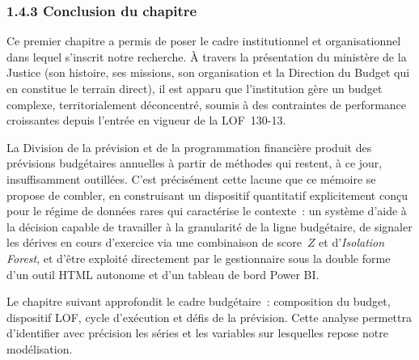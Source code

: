 \subsubsection*{1.4.3 \quad Conclusion du chapitre}

Ce premier chapitre a permis de poser le cadre institutionnel et organisationnel dans lequel s'inscrit notre recherche. \`A travers la pr\'esentation du minist\`ere de la Justice (son histoire, ses missions, son organisation et la Direction du Budget qui en constitue le terrain direct), il est apparu que l'institution g\`ere un budget complexe, territorialement d\'econcentr\'e, soumis \`a des contraintes de performance croissantes depuis l'entr\'ee en vigueur de la LOF~130-13.

La Division de la pr\'evision et de la programmation financi\`ere produit des pr\'evisions budg\'etaires annuelles \`a partir de m\'ethodes qui restent, \`a ce jour, insuffisamment outill\'ees. C'est pr\'ecis\'ement cette lacune que ce m\'emoire se propose de combler, en construisant un dispositif quantitatif explicitement con\c{c}u pour le r\'egime de donn\'ees rares qui caract\'erise le contexte~: un syst\`eme d'aide \`a la d\'ecision capable de travailler \`a la granularit\'e de la ligne budg\'etaire, de signaler les d\'erives en cours d'exercice via une combinaison de score~$Z$ et d'\textit{Isolation Forest}, et d'\^etre exploit\'e directement par le gestionnaire sous la double forme d'un outil HTML autonome et d'un tableau de bord Power BI.

Le chapitre suivant approfondit le cadre budg\'etaire~: composition du budget, dispositif LOF, cycle d'ex\'ecution et d\'efis de la pr\'evision. Cette analyse permettra d'identifier avec pr\'ecision les s\'eries et les variables sur lesquelles repose notre mod\'elisation.

